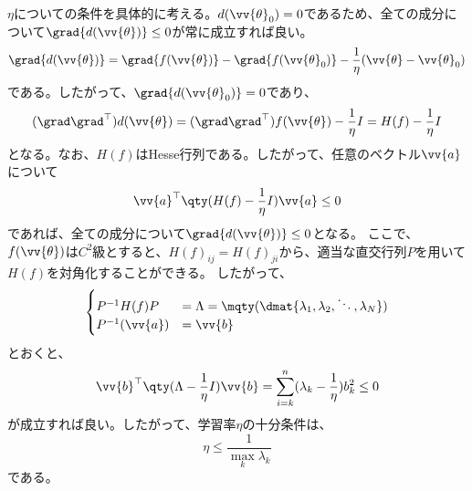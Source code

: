 \documentclass[a4paper,11pt,uplatex]{jsarticle}%
\begin{document}
$\eta$についての条件を具体的に考える。$d(\vv{\theta}_0)=0$であるため、全ての成分について$\grad{d(\vv{\theta})}\leq 0$が常に成立すれば良い。
\begin{equation}
  \grad{d(\vv{\theta})} = \grad{f(\vv{\theta})}-\grad{f(\vv{\theta}_0)}-\frac{1}{\eta}(\vv{\theta}-\vv{\theta}_0)
\end{equation}
である。したがって、$\grad{d(\vv{\theta}_0)}=0$であり、
\begin{equation}
  (\grad\grad^{\top})d(\vv{\theta})=(\grad\grad^{\top})f(\vv{\theta}) - \frac{1}{\eta}I = H(f)-\frac{1}{\eta}I
\end{equation}
となる。なお、$H(f)$はHesse行列である。したがって、任意のベクトル$\vv{a}$について
\begin{equation}
  \vv{a}^{\top}\qty(H(f)-\frac{1}{\eta} I)\vv{a} \leq 0
\end{equation}
であれば、全ての成分について$\grad{d(\vv{\theta})}\leq 0$となる。
ここで、$f(\vv{\theta})$は$C^2$級とすると、$H(f)_{ij}=H(f)_{ji}$から、適当な直交行列$P$を用いて$H(f)$を対角化することができる。
したがって、
\begin{equation}
  \begin{cases}
    P^{-1}H(f)P    & = \Lambda = \mqty(\dmat{\lambda_1,\lambda_2,\ddots,\lambda_N}) \\
    P^{-1}(\vv{a}) & = \vv{b}
  \end{cases}
\end{equation}
とおくと、
\begin{equation}
  \vv{b}^{\top}\qty(\Lambda-\frac{1}{\eta} I)\vv{b} = \sum_{i=k}^n(\lambda_k-\frac{1}{\eta})b_k^2 \leq 0
\end{equation}
が成立すれば良い。したがって、学習率$\eta$の十分条件は、
\begin{equation}
  \eta\leq \frac{1}{\max_{k}{\lambda_k}}
\end{equation}
である。
\end{document}
